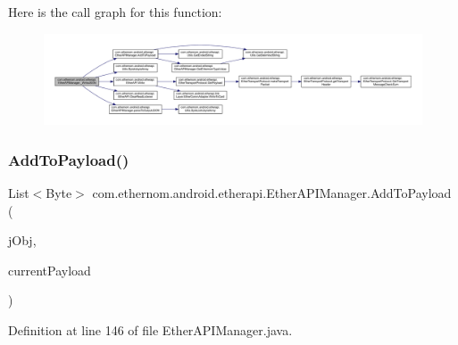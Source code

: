 Here is the call graph for this function\+:
\nopagebreak
\begin{figure}[H]
\begin{center}
\leavevmode
\includegraphics[width=350pt]{classcom_1_1ethernom_1_1android_1_1etherapi_1_1_ether_a_p_i_manager_ac427fa54412d242b18a243a1e630ed0f_cgraph}
\end{center}
\end{figure}
\mbox{\label{classcom_1_1ethernom_1_1android_1_1etherapi_1_1_ether_a_p_i_manager_aea87690e440c3985866b3e9a4340c930}} 
\subsubsection{\texorpdfstring{Add\+To\+Payload()}{AddToPayload()}}
{\footnotesize\ttfamily List$<$Byte$>$ com.\+ethernom.\+android.\+etherapi.\+Ether\+A\+P\+I\+Manager.\+Add\+To\+Payload (\begin{DoxyParamCaption}\item[{J\+S\+O\+N\+Object}]{j\+Obj,  }\item[{List$<$ Byte $>$}]{current\+Payload }\end{DoxyParamCaption})\hspace{0.3cm}{\ttfamily [private]}}



Definition at line 146 of file Ether\+A\+P\+I\+Manager.\+java.

